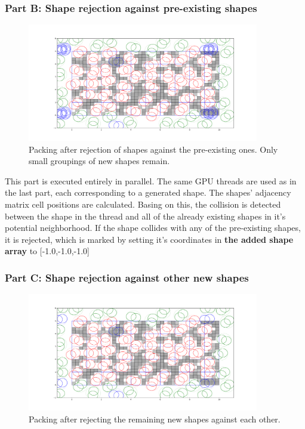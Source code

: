 \documentclass[12pt, oneside]{report}
\begin{document}
\subsubsection{Part B: Shape rejection against pre-existing shapes}

\begin{figure}[H]
  \centering
	\label{GPURSA_Process_2}
	\includegraphics[width=0.9\textwidth,keepaspectratio]{Images/GPURSA/Figure_3.pdf}
	\caption{Packing after rejection of shapes against the pre-existing ones. Only small groupings of new shapes remain.}
\end{figure}

This part is executed entirely in parallel. \newline
The same GPU threads are used as in the last part, each corresponding to a generated shape. The shapes' adjacency matrix cell positions are calculated. Basing on this, the collision is detected between the shape in the thread and all of the already existing shapes in it's potential neighborhood. If the shape collides with any of the pre-existing shapes, it is rejected, which is marked by setting it's coordinates in \textbf{the added shape array} to [-1.0,-1.0,-1.0]

\subsubsection{Part C: Shape rejection against other new shapes}

\begin{figure}[H]
  \centering
	\label{GPURSA_Process_4}
	\includegraphics[width=0.9\textwidth,keepaspectratio]{Images/GPURSA/Figure_4.pdf}
	\caption{Packing after rejecting the remaining new shapes against each other.}
\end{figure}
\end{document}
